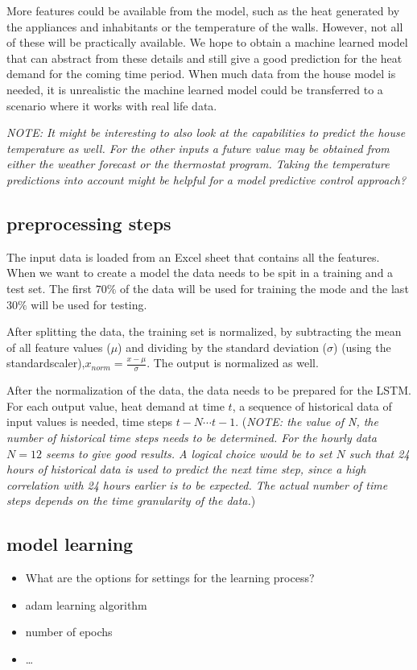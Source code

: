 More features could be available from the model, such as the heat generated by the appliances and inhabitants or the temperature of the walls. However, not all of these will be practically available. We hope to obtain a machine learned model that can abstract from these details and still give a good prediction for the heat demand for the coming time period. When much data from the house model is needed, it is unrealistic the machine learned model could be transferred to a scenario where it works with real life data.  

\textit{NOTE: It might be interesting to also look at the capabilities to predict the house temperature as well. For the other inputs a future value may be obtained from either the weather forecast or the thermostat program. Taking the temperature predictions into account might be helpful for a model predictive control approach?}

\subsection{preprocessing steps}
The input data is loaded from an Excel sheet that contains all the features. When we want to create a model the data needs to be spit in a training and a test set. The first $70\%$ of the data will be used for training the mode and the last $30\%$ will be used for testing. 

After splitting the data, the training set is normalized, by subtracting the mean of all feature values ($\mu$) and dividing by the standard deviation ($\sigma$) (using the standardscaler),$x_{norm}= \frac{x-\mu}{\sigma}$. The output is normalized as well.

After the normalization of the data, the data needs to be prepared for the LSTM. For each output value, heat demand at time $t$, a sequence of historical data of input values is needed, time steps $t-N \cdots t-1$.  (\textit{NOTE: the value of N, the number of historical time steps needs to be determined. For the hourly data $N=12$ seems to give good results. A logical choice would be to set $N$ such that 24 hours of historical data is used to predict the next time step, since a high correlation with 24 hours earlier is to be expected. The actual number of time steps depends on the time granularity of the data.})

\subsection{model learning}
\begin{itemize}
\item What are the options for settings for the learning process?
\item adam learning algorithm
\item number of epochs
\item \ldots
\end{itemize}

